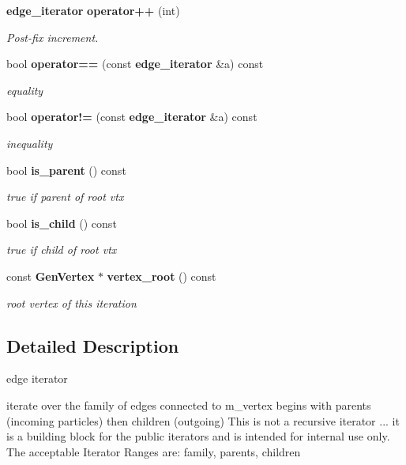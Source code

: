 \begin{CompactItemize}
{\bf edge\_\-iterator} {\bf operator++} (int)
\begin{CompactList}\small\item\em Post-fix increment. \item\end{CompactList}\item 
bool {\bf operator==} (const {\bf edge\_\-iterator} \&a) const
\begin{CompactList}\small\item\em equality \item\end{CompactList}\item 
bool {\bf operator!=} (const {\bf edge\_\-iterator} \&a) const
\begin{CompactList}\small\item\em inequality \item\end{CompactList}\item 
bool {\bf is\_\-parent} () const
\begin{CompactList}\small\item\em true if parent of root vtx \item\end{CompactList}\item 
bool {\bf is\_\-child} () const
\begin{CompactList}\small\item\em true if child of root vtx \item\end{CompactList}\item 
const {\bf Gen\-Vertex} $\ast$ {\bf vertex\_\-root} () const
\begin{CompactList}\small\item\em root vertex of this iteration \item\end{CompactList}\end{CompactItemize}


\subsection{Detailed Description}
edge iterator 

iterate over the family of edges connected to m\_\-vertex begins with parents (incoming particles) then children (outgoing) This is not a recursive iterator ... it is a building block for the public iterators and is intended for internal use only. The acceptable Iterator Ranges are: family, parents, children 



